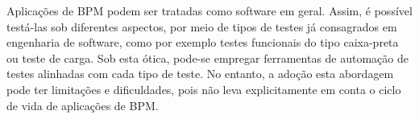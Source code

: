 \documentclass[12pt]{article}
\begin{document}


Aplicações de BPM podem ser tratadas como software em geral. Assim, é possível testá-las sob diferentes aspectos, por meio de tipos de testes já consagrados em engenharia de software, como por exemplo testes funcionais do tipo caixa-preta ou teste de carga. Sob esta ótica, pode-se empregar ferramentas de automação de testes alinhadas com cada tipo de teste. No entanto, a adoção esta abordagem pode ter limitações e dificuldades, pois não leva explicitamente em conta o ciclo de vida de aplicações de BPM.









\end{document}
